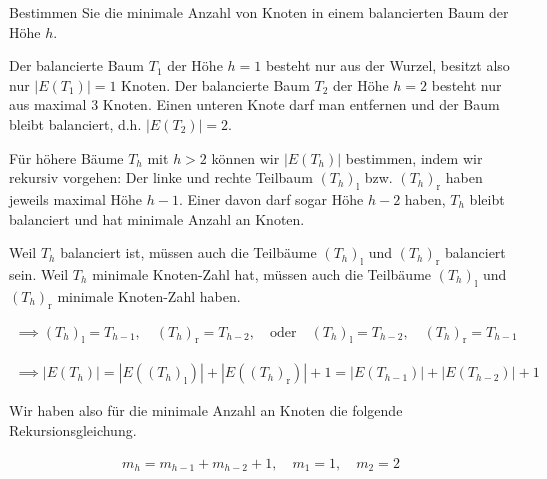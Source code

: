 
\begin{exercise}

Bestimmen Sie die minimale Anzahl von Knoten in einem balancierten Baum der Höhe $h$.

\end{exercise}


\begin{solution}

\phantom{}


Der balancierte Baum $T_1$ der Höhe $h = 1$ besteht nur aus der Wurzel, besitzt also nur $|E(T_1)| = 1$ Knoten.
Der balancierte Baum $T_2$ der Höhe $h = 2$ besteht nur aus maximal $3$ Knoten.
Einen unteren Knote darf man entfernen und der Baum bleibt balanciert, d.h. $|E(T_2)| = 2$.

Für höhere Bäume $T_h$ mit $h > 2$ können wir $|E(T_h)|$ bestimmen, indem wir rekursiv vorgehen:
Der linke und rechte Teilbaum $(T_h)_\mathrm{l}$ bzw. $(T_h)_\mathrm{r}$ haben jeweils maximal Höhe $h-1$.
Einer davon darf sogar Höhe $h-2$ haben, $T_h$ bleibt balanciert und hat minimale Anzahl an Knoten.

Weil $T_h$ balanciert ist, müssen auch die Teilbäume $(T_h)_\mathrm{l}$ und $(T_h)_\mathrm{r}$ balanciert sein.
Weil $T_h$ minimale Knoten-Zahl hat, müssen auch die Teilbäume $(T_h)_\mathrm{l}$ und $(T_h)_\mathrm{r}$ minimale Knoten-Zahl haben.

\begin{align*}
  \implies
  (T_h)_\mathrm{l} = T_{h-1},
  \quad
  (T_h)_\mathrm{r} = T_{h-2},
  \quad
  \text{oder}
  \quad  
  (T_h)_\mathrm{l} = T_{h-2},
  \quad
  (T_h)_\mathrm{r} = T_{h-1}
\end{align*}

\begin{align*}
  \implies
  |E(T_h)|
  =
  |E((T_h)_\mathrm{l})| + |E((T_h)_\mathrm{r})| + 1
  =
  |E(T_{h-1})| + |E(T_{h-2})| + 1
\end{align*}

Wir haben also für die minimale Anzahl an Knoten die folgende Rekursionsgleichung.

\begin{align*}
  m_h = m_{h-1} + m_{h-2} + 1,
  \quad
  m_1 = 1,
  \quad
  m_2 = 2
\end{align*}


\end{solution}
